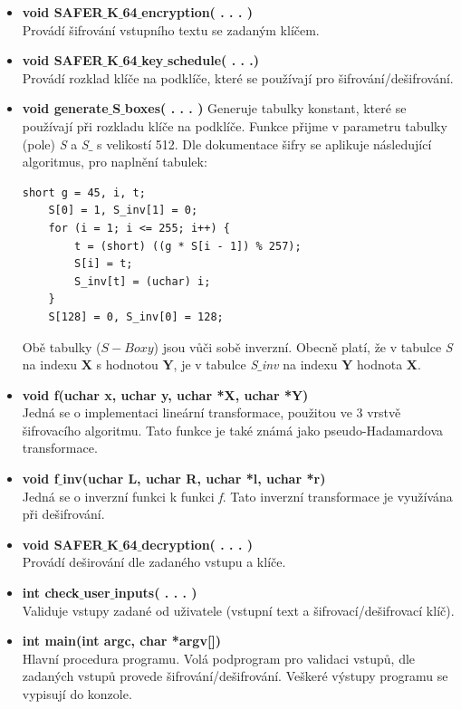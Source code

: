 \documentclass[12pt,a4paper]{article}
\begin{document}
\begin{itemize}

\item \textbf{void SAFER$\_$K$\_$64$\_$encryption( . . . )} \\
Provádí šifrování vstupního textu se zadaným klíčem. 


\item \textbf{void SAFER$\_$K$\_$64$\_$key$\_$schedule( . . .)} \\
Provádí rozklad klíče na podklíče, které se používají pro šifrování/dešifrování.


\item \textbf{void generate$\_$S$\_$boxes( . . . )}
Generuje tabulky konstant, které se používají při rozkladu klíče na podklíče. Funkce přijme v parametru tabulky (pole) \emph{S} a \emph{S$\_$} s velikostí 512. 
Dle dokumentace šifry se aplikuje následující algoritmus, pro naplnění tabulek:
\lstset{language=C} %
\begin{lstlisting}[frame=single]
	short g = 45, i, t;
	S[0] = 1, S_inv[1] = 0;
	for (i = 1; i <= 255; i++) {
		t = (short) ((g * S[i - 1]) % 257);
		S[i] = t;
		S_inv[t] = (uchar) i;
	}
	S[128] = 0, S_inv[0] = 128;
\end{lstlisting}
Obě tabulky ($S-Boxy$) jsou vůči sobě inverzní. Obecně platí, že v tabulce \emph{S} na indexu $\textbf{X}$ s hodnotou $\textbf{Y}$, je v tabulce \emph{S$\_$inv }na indexu $\textbf{Y}$ hodnota $\textbf{X}$. 

\item \textbf{void f(uchar x, uchar y, uchar *X, uchar *Y)}\\
Jedná se o implementaci lineární transformace, použitou ve 3 vrstvě šifrovacího algoritmu. Tato funkce je také známá jako pseudo-Hadamardova transformace.

\item \textbf{void f$\_$inv(uchar L, uchar R, uchar *l, uchar *r)} \\
Jedná se o inverzní funkci k funkci \textit{f}. Tato inverzní transformace je využívána při dešifrování.

\item \textbf{void SAFER$\_$K$\_$64$\_$decryption( . . . )}\\
Provádí deširování dle zadaného vstupu a klíče.

\item \textbf{int check$\_$user$\_$inputs( . . . )} \\
Validuje vstupy zadané od uživatele (vstupní text a šifrovací/dešifrovací klíč).

\item \textbf{int main(int argc, char *argv[]) }\\
Hlavní procedura programu. Volá podprogram pro validaci vstupů, dle zadaných vstupů provede šifrování/dešifrování. Veškeré výstupy programu se vypisují do konzole.

\end{itemize}
\end{document}
